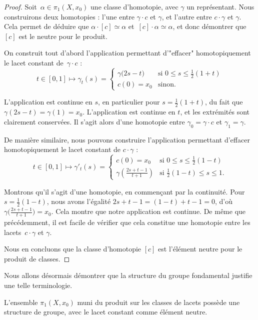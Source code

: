 \begin{proof}
Soit~${\alpha\in\pi_1(X,x_0)}$ une classe d'homotopie, avec $\gamma$ un représentant. Nous construirons deux homotopies : l'une entre $\gamma\cdot c$ et $\gamma$, et l'autre entre $c\cdot\gamma$ et $\gamma$. Cela permet de déduire que $\alpha\cdot [c]\simeq\alpha$ et~$[c]\cdot \alpha\simeq \alpha$, et donc démontrer que $[c]$ est le neutre pour le produit.

On construit tout d'abord l'application permettant d'"effacer" homotopiquement le lacet constant de~$\gamma\cdot c$ : \[t\in[0,1]\mapsto\gamma_t(s)=\left\{\begin{matrix}
\gamma\big(2s-t\big)&\text{si }0\leq s\leq \frac{1}{2}(1+t)\\ 
c(0)=x_0&\text{sinon}.
\end{matrix}\right.\]

L'application est continue en $s$, en particulier pour $s=\frac{1}{2}(1+t)$, du fait que $\gamma(2s-t)=\gamma(1)=x_0$. L'application est continue en $t$, et les extrémités sont clairement conservées. Il s'agit alors d'une homotopie entre $\gamma_0=\gamma\cdot c$ et $\gamma_1=\gamma$.

De manière similaire, nous pouvons construire l'application permettant d'effacer homotopiquement le lacet constant de $c\cdot\gamma$ : \[t\in[0,1]\mapsto\gamma'_t(s)=\left\{\begin{matrix}
c\left(0\right)=x_0&\text{si }0\leq s\leq \frac{1}{2}(1-t)\\ 
\gamma\left(\frac{2s+t-1}{t+1}\right)&\text{si }\frac{1}{2}(1-t)\leq s\leq 1.
\end{matrix}\right.\]

Montrons qu'il s'agit d'une homotopie, en commençant par la continuité. Pour $s=\frac{1}{2}(1-t)$, nous avons l'égalité ${2s+t-1=(1-t)+t-1=0}$, d'où $\gamma\big(\frac{2s+t-1}{t+1}\big)=x_0$. Cela montre que notre application est continue. De même que précédemment, il est facile de vérifier que cela constitue une homotopie entre les lacets~$c\cdot\gamma$ et $\gamma$.

Nous en concluons que la classe d'homotopie $[c]$ est l'élément neutre pour le produit de classes.
\end{proof}

Nous allons désormais démontrer que la structure du groupe fondamental justifie une telle terminologie.

\begin{theorem}
L'ensemble $\pi_1(X,x_0)$ muni du produit sur les classes de lacets possède une structure de groupe, avec le lacet constant comme élément neutre.
\end{theorem}

